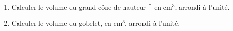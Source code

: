 \documentclass[exercice, a4]{thedocument}%
\begin{document}
\begin{enumerate}
    \medskip


        \begin{enumerate}
        \item Calculer le volume du grand cône de hauteur [] en cm$^3$, arrondi à l'unité.
        \item Calculer le volume du gobelet, en cm$^3$, arrondi à l'unité.
        \end{enumerate}
    \end{enumerate}
    \showthesource
\end{document}
